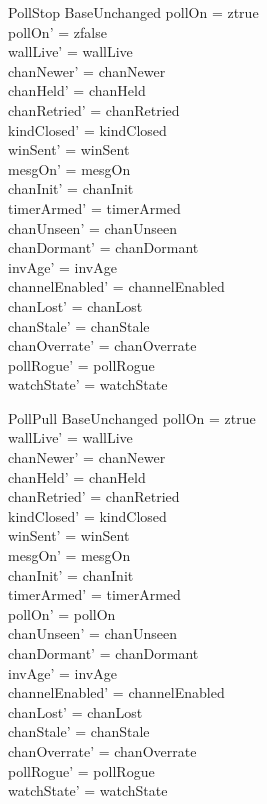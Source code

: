 \documentclass[a4paper,10pt,fleqn]{article}
\begin{document}
\begin{schema}{PollStop}
  BaseUnchanged
  \where
  pollOn = ztrue \\
  pollOn' = zfalse \\
  wallLive' = wallLive \\
  chanNewer' = chanNewer \\
  chanHeld' = chanHeld \\
  chanRetried' = chanRetried \\
  kindClosed' = kindClosed \\
  winSent' = winSent \\
  mesgOn' = mesgOn \\
  chanInit' = chanInit \\
  timerArmed' = timerArmed \\
  chanUnseen' = chanUnseen \\
  chanDormant' = chanDormant \\
  invAge' = invAge \\
  channelEnabled' = channelEnabled \\
  chanLost' = chanLost \\
  chanStale' = chanStale \\
  chanOverrate' = chanOverrate \\
  pollRogue' = pollRogue \\
  watchState' = watchState
\end{schema}

\begin{schema}{PollPull}
  BaseUnchanged
  \where
  pollOn = ztrue \\
  wallLive' = wallLive \\
  chanNewer' = chanNewer \\
  chanHeld' = chanHeld \\
  chanRetried' = chanRetried \\
  kindClosed' = kindClosed \\
  winSent' = winSent \\
  mesgOn' = mesgOn \\
  chanInit' = chanInit \\
  timerArmed' = timerArmed \\
  pollOn' = pollOn \\
  chanUnseen' = chanUnseen \\
  chanDormant' = chanDormant \\
  invAge' = invAge \\
  channelEnabled' = channelEnabled \\
  chanLost' = chanLost \\
  chanStale' = chanStale \\
  chanOverrate' = chanOverrate \\
  pollRogue' = pollRogue \\
  watchState' = watchState
\end{schema}
\end{document}
